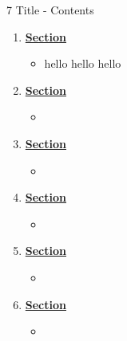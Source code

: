 \documentclass[12pt,letterpaper]{article}
\begin{document}
\setcounter{section}{7} %
\begin{chapbox}{7 Title - Contents}{ 
\begin{enumerate}[font=\bfseries, wide]
\item \hyperlink{7.1}{\textbf{Section}}
    \begin{itemize}
        \item hello hello hello
    \end{itemize}
    \item \hyperlink{7.2}{\textbf{Section}}
    \begin{itemize}
        \item 
    \end{itemize}
\item \hyperlink{7.3}{\textbf{Section}}
    \begin{itemize}
        \item 
    \end{itemize}
\item \hyperlink{7.4}{\textbf{Section}}
    \begin{itemize}
        \item 
    \end{itemize}
\item \hyperlink{7.5}{\textbf{Section}}
    \begin{itemize}
        \item 
    \end{itemize}
\item \hyperlink{7.6}{\textbf{Section}}
    \begin{itemize}
        \item 
    \end{itemize}
\end{enumerate}
}\end{chapbox}
\end{document}
